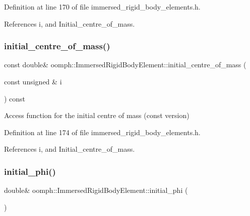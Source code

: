Definition at line 170 of file immersed\+\_\+rigid\+\_\+body\+\_\+elements.\+h.



References i, and Initial\+\_\+centre\+\_\+of\+\_\+mass.

\mbox{\label{classoomph_1_1ImmersedRigidBodyElement_af19a740e7de78418af938ea8f23e5a86}} 
\subsubsection{\texorpdfstring{initial\+\_\+centre\+\_\+of\+\_\+mass()}{initial\_centre\_of\_mass()}\hspace{0.1cm}{\footnotesize\ttfamily [2/2]}}
{\footnotesize\ttfamily const double\& oomph\+::\+Immersed\+Rigid\+Body\+Element\+::initial\+\_\+centre\+\_\+of\+\_\+mass (\begin{DoxyParamCaption}\item[{const unsigned \&}]{i }\end{DoxyParamCaption}) const\hspace{0.3cm}{\ttfamily [inline]}}



Access function for the initial centre of mass (const version) 



Definition at line 174 of file immersed\+\_\+rigid\+\_\+body\+\_\+elements.\+h.



References i, and Initial\+\_\+centre\+\_\+of\+\_\+mass.

\mbox{\label{classoomph_1_1ImmersedRigidBodyElement_aaaff87f9808037afd0ef9adebfb0ebde}} 
\subsubsection{\texorpdfstring{initial\+\_\+phi()}{initial\_phi()}}
{\footnotesize\ttfamily double\& oomph\+::\+Immersed\+Rigid\+Body\+Element\+::initial\+\_\+phi (\begin{DoxyParamCaption}{ }\end{DoxyParamCaption})\hspace{0.3cm}{\ttfamily [inline]}}



